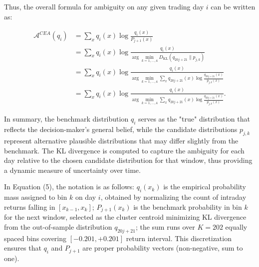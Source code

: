 \documentclass[preprint,12pt,authoryear]{elsarticle}
\renewcommand{\textcolor}[2]{\begingroup\color{#1}#2\endgroup}
\begin{document}
Thus, the overall formula for ambiguity on any given trading day \(i\) can be written as:

\[
\begin{aligned}
\mathcal{A}^{CEA}(q_i) &= \sum_{x} q_i(x) \log \frac{q_i(x)}{P_{j+1}(x)} \\
&= \sum_{x} q_i(x) \log \frac{q_i(x)}{\arg\min_{k=1,\dots,4} D_{\mathrm{KL}}(q_{20j+21} \parallel p_{j,k})} \\
&= \sum_{x} q_i(x) \log \frac{q_i(x)}{\arg\min_{k=1,\dots,4} \sum_{x} q_{20j+21}(x) \log \frac{q_{20j+21}(x)}{p_{j,k}(x)}} \\
&= \sum_{x} q_i(x) \log \frac{q_i(x)}{\arg\min_{k=1,\dots,4} \sum_{x} q_{20j+21}(x) \log \frac{q_{20j+21}(x)}{p_{j,k}(x)}}.
\end{aligned}
\]

In summary, the benchmark distribution \(q_i\) serves as the "true" distribution that reflects the decision-maker's general belief, while the candidate distributions \(p_{j,k}\) represent alternative plausible distributions that may differ slightly from the benchmark. The KL divergence is computed to capture the ambiguity for each day relative to the chosen candidate distribution for that window, thus providing a dynamic measure of uncertainty over time.

\textcolor{red}{In Equation (5), the notation is as follows: $q_i(x_k)$ is the empirical probability mass assigned to bin $k$ on day $i$, obtained by normalizing the count of intraday returns falling in $[x_{k-1}, x_k]$; $P_{j+1}(x_k)$ is the benchmark probability in bin $k$ for the next window, selected as the cluster centroid minimizing KL divergence from the out-of-sample distribution $q_{20j+21}$; the sum runs over $K=202$ equally spaced bins covering $[-0.201, +0.201]$ return interval. This discretization ensures that $q_i$ and $P_{j+1}$ are proper probability vectors (non-negative, sum to one).}
\end{document}
